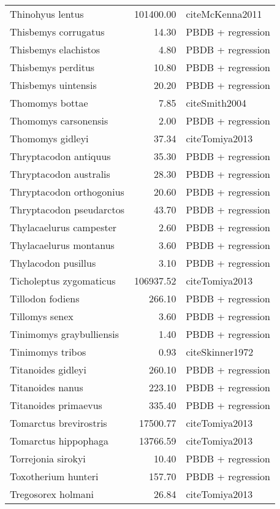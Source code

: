 \begin{table}[ht]
\begin{tabular}{lrl}
  Thinohyus lentus & 101400.00 & cite{McKenna2011} \\ 
  Thisbemys corrugatus & 14.30 & PBDB + regression \\ 
  Thisbemys elachistos & 4.80 & PBDB + regression \\ 
  Thisbemys perditus & 10.80 & PBDB + regression \\ 
  Thisbemys uintensis & 20.20 & PBDB + regression \\ 
  Thomomys bottae & 7.85 & cite{Smith2004} \\ 
  Thomomys carsonensis & 2.00 & PBDB + regression \\ 
  Thomomys gidleyi & 37.34 & cite{Tomiya2013} \\ 
  Thryptacodon antiquus & 35.30 & PBDB + regression \\ 
  Thryptacodon australis & 28.30 & PBDB + regression \\ 
  Thryptacodon orthogonius & 20.60 & PBDB + regression \\ 
  Thryptacodon pseudarctos & 43.70 & PBDB + regression \\ 
  Thylacaelurus campester & 2.60 & PBDB + regression \\ 
  Thylacaelurus montanus & 3.60 & PBDB + regression \\ 
  Thylacodon pusillus & 3.10 & PBDB + regression \\ 
  Ticholeptus zygomaticus & 106937.52 & cite{Tomiya2013} \\ 
  Tillodon fodiens & 266.10 & PBDB + regression \\ 
  Tillomys senex & 3.60 & PBDB + regression \\ 
  Tinimomys graybulliensis & 1.40 & PBDB + regression \\ 
  Tinimomys tribos & 0.93 & cite{Skinner1972} \\ 
  Titanoides gidleyi & 260.10 & PBDB + regression \\ 
  Titanoides nanus & 223.10 & PBDB + regression \\ 
  Titanoides primaevus & 335.40 & PBDB + regression \\ 
  Tomarctus brevirostris & 17500.77 & cite{Tomiya2013} \\ 
  Tomarctus hippophaga & 13766.59 & cite{Tomiya2013} \\ 
  Torrejonia sirokyi & 10.40 & PBDB + regression \\ 
  Toxotherium hunteri & 157.70 & PBDB + regression \\ 
  Tregosorex holmani & 26.84 & cite{Tomiya2013} \\ 

\end{tabular}
\end{table}
